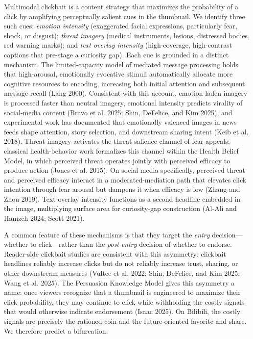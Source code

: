 \documentclass[
  12pt,
]{article}
\begin{document}
Multimodal clickbait is a content strategy that maximizes the
probability of a click by amplifying perceptually salient cues in the
thumbnail. We identify three such cues: \emph{emotion intensity}
(exaggerated facial expressions, particularly fear, shock, or disgust);
\emph{threat imagery} (medical instruments, lesions, distressed bodies,
red warning marks); and \emph{text overlay intensity} (high-coverage,
high-contrast captions that pre-stage a curiosity gap). Each cue is
grounded in a distinct mechanism. The limited-capacity model of mediated
message processing holds that high-arousal, emotionally evocative
stimuli automatically allocate more cognitive resources to encoding,
increasing both initial attention and subsequent message recall (Lang
2000). Consistent with this account, emotion-laden imagery is processed
faster than neutral imagery, emotional intensity predicts virality of
social-media content (Bravo et al. 2025; Shin, DeFelice, and Kim 2025),
and experimental work has documented that emotionally valenced images in
news feeds shape attention, story selection, and downstream sharing
intent (Keib et al. 2018). Threat imagery activates the threat-salience
channel of fear appeals; classical health-behavior work formalizes this
channel within the Health Belief Model, in which perceived threat
operates jointly with perceived efficacy to produce action (Jones et al.
2015). On social media specifically, perceived threat and perceived
efficacy interact in a moderated-mediation path that elevates click
intention through fear arousal but dampens it when efficacy is low
(Zhang and Zhou 2019). Text-overlay intensity functions as a second
headline embedded in the image, multiplying surface area for
curiosity-gap construction (Al-Ali and Hamzeh 2024; Scott 2021).

A common feature of these mechanisms is that they target the
\emph{entry} decision---whether to click---rather than the
\emph{post-entry} decision of whether to endorse. Reader-side clickbait
studies are consistent with this asymmetry: clickbait headlines reliably
increase clicks but do not reliably increase trust, sharing, or other
downstream measures (Vultee et al. 2022; Shin, DeFelice, and Kim 2025;
Wang et al. 2025). The Persuasion Knowledge Model gives this asymmetry a
name: once viewers recognize that a thumbnail is engineered to maximize
their click probability, they may continue to click while withholding
the costly signals that would otherwise indicate endorsement (Isaac
2025). On Bilibili, the costly signals are precisely the rationed coin
and the future-oriented favorite and share. We therefore predict a
bifurcation:
\end{document}
